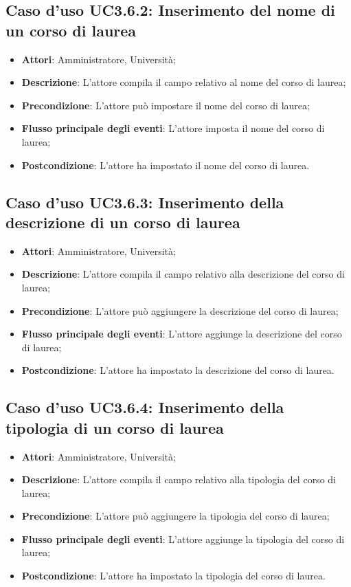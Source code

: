 \subsection{Caso d'uso \texorpdfstring{UC3.6.2}{UC3.6.2}: Inserimento del nome di un corso di laurea}
\begin{itemize}
\item \textbf{Attori}: Amministratore, Università;
\item \textbf{Descrizione}: L'attore compila il campo relativo al nome del corso di laurea;
\item \textbf{Precondizione}: L'attore può impostare il nome del corso di laurea;
\item \textbf{Flusso principale degli eventi}: L'attore imposta il nome del corso di laurea;
\item \textbf{Postcondizione}: L'attore ha impostato il nome del corso di laurea.
\end{itemize}
\subsection{Caso d'uso \texorpdfstring{UC3.6.3}{UC3.6.3}: Inserimento della descrizione di un corso di laurea}
\begin{itemize}
\item \textbf{Attori}: Amministratore, Università;
\item \textbf{Descrizione}: L'attore compila il campo relativo alla descrizione del corso di laurea;
\item \textbf{Precondizione}: L'attore può aggiungere la descrizione del corso di laurea;

\item \textbf{Flusso principale degli eventi}: L'attore aggiunge la descrizione del corso di laurea;
\item \textbf{Postcondizione}: L'attore ha impostato la descrizione del corso di laurea.
\end{itemize}
\subsection{Caso d'uso \texorpdfstring{UC3.6.4}{UC3.6.4}: Inserimento della tipologia di un corso di laurea}
\begin{itemize}
\item \textbf{Attori}: Amministratore, Università;
\item \textbf{Descrizione}: L'attore compila il campo relativo alla tipologia del corso di laurea;
\item \textbf{Precondizione}: L'attore può aggiungere la tipologia del corso di laurea;
\item \textbf{Flusso principale degli eventi}: L'attore aggiunge la tipologia del corso di laurea;
\item \textbf{Postcondizione}: L'attore ha impostato la tipologia del corso di laurea.
\end{itemize}
